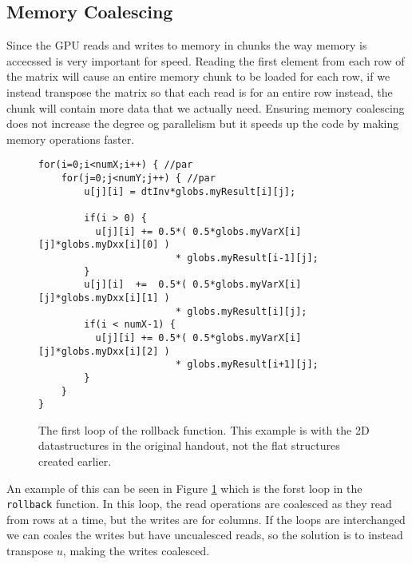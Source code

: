 \subsection{Memory Coalescing}

Since the GPU reads and writes to memory in chunks the way memory is accecssed
is very important for speed. Reading the first element from each row of the
matrix will cause an entire memory chunk to be loaded for each row, if we
instead transpose the matrix so that each read is for an entire row instead, the
chunk will contain more data that we actually need. Ensuring memory coalescing
does not increase the degree og parallelism but it speeds up the code by making
memory operations faster.

\begin{figure}[H]
    \begin{lstlisting}
for(i=0;i<numX;i++) { //par
    for(j=0;j<numY;j++) { //par
        u[j][i] = dtInv*globs.myResult[i][j];

        if(i > 0) {
          u[j][i] += 0.5*( 0.5*globs.myVarX[i][j]*globs.myDxx[i][0] )
                        * globs.myResult[i-1][j];
        }
        u[j][i]  +=  0.5*( 0.5*globs.myVarX[i][j]*globs.myDxx[i][1] )
                        * globs.myResult[i][j];
        if(i < numX-1) {
          u[j][i] += 0.5*( 0.5*globs.myVarX[i][j]*globs.myDxx[i][2] )
                        * globs.myResult[i+1][j];
        }
    }
}
    \end{lstlisting}
    \caption{The first loop of the rollback function. This example is with the
    2D datastructures in the original handout, not the flat structures created
    earlier.}
    \label{code:coal1}
\end{figure}

An example of this can be seen in Figure \ref{code:coal1} which is the forst
loop in the \texttt{rollback} function. In this loop, the read operations are
coalesced as they read from rows at a time, but the writes are for columns. If
the loops are interchanged we can coales the writes but have uncualesced reads,
so the solution is to instead transpose $u$, making the writes coalesced.

